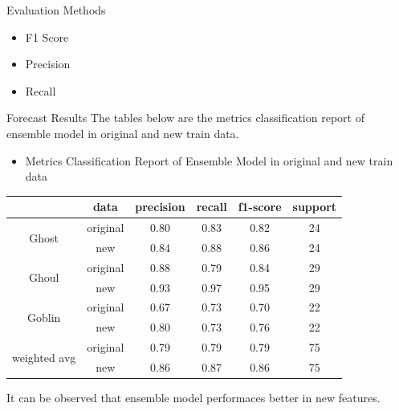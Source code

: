 \documentclass[
size=14pt,
paper=smartboard,  %
mode=present, 		%
display=slides, 	%
pauseslide,
fleqn,leqno]{powerdot}
\begin{document}
\begin{slide}{Evaluation Methods}
	\begin{center}
		\begin{itemize}
			\item F1 Score
			\item Precision
			\item Recall
		\end{itemize}
	\end{center}
	
\end{slide}
\begin{slide}{Forecast Results}
The tables below are 
the metrics classification report 
of ensemble model in 
original and new train data.
\begin{itemize}
	\item Metrics Classification Report of Ensemble Model in original and new train data
\end{itemize}
\begin{center}
	\begin{tabular}{cccccc}
		\hline
		& data &precision & recall & f1-score & support\\
		\hline
		\multirow{2}{*}{Ghost}  & original & 0.80   &   0.83  & 0.82 & 24\\
		& new &0.84  &  0.88  & 0.86 &  24\\
		\hline
		\multirow{2}{*}{Ghoul}  & original & 0.88  &  0.79  &   0.84   &   29\\
		& new & 0.93  & 0.97 &  0.95 &  29\\
		\hline
		\multirow{2}{*}{Goblin}  & original & 0.67  &  0.73 &  0.70  &   22\\
		& new  &  0.80 &  0.73  & 0.76  &  22\\
		\hline  
		\multirow{2}{*}{weighted avg}  & original & 0.79  &  0.79 &  0.79  &  75\\
		& new  &  0.86 & 0.87  &  0.86  &  75\\
		\hline 
	\end{tabular}
\end{center}
It can be observed that ensemble model
performaces better in new features.

\end{slide}


\end{document}
